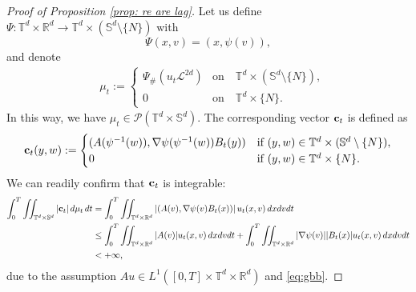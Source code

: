 \documentclass[11pt,reqno,a4paper]{amsart}
\newcommand{\R}{\mathbb{R}}
\theoremstyle{definition}
\theoremstyle{remark}
\numberwithin{equation}{section}
\newcommand{\T} {\mathbb T}
\newcommand{\bfc}{{\bf c}}
\newcommand{\bbS}{\mathbb S}
\newcommand{\calL}{\mathcal L}
\newcommand{\calP}{\mathcal P}
\newcommand{\dx}{\textnormal{d}x}
\newcommand{\dv}{\textnormal{d}v}
\newcommand{\dt}{\textnormal{d}t}
\begin{document}
\begin{proof}[Proof of Proposition \ref{prop: re are lag}]
    Let us define $\Psi:\T^d\times\R^d \to \T^d\times (\bbS^d\setminus\{N\})$ with
\[
\Psi(x,v) = (x,\psi(v)),
\]
    and denote
    \begin{align*}
        &\mu_t := \begin{cases}
        \Psi_{\#}(u_t \calL^{2d}) & \text{on}\quad \T^d\times(\bbS^d \setminus \{N\}),\\
        0 & \text{on}\quad \T^d\times\{N\}.
        \end{cases}
    \end{align*}
    In this way, we have $\mu_t\in \calP(\T^d\times\bbS^d)$. The corresponding vector $\bfc_t$ is defined as
    \begin{align*}
        \bfc_t(y,w) := \begin{cases}
             (A(\psi^{-1}(w)), \nabla \psi(\psi^{-1}(w)) B_t(y))& \text{if }(y,w)\in \T^d\times (\bbS^d\setminus \{N\}),\\
            0 & \text{if }(y,w)\in \T^d\times \{N\}.
        \end{cases}
    \end{align*}
    We can readily confirm that $\bfc_t$ is integrable:
    \begin{align*}
    \int_0^T \iint_{\T^d\times\bbS^d} |\bfc_t| \, \textnormal{d}\mu_t \,\dt &= \int_0^T \iint_{\T^d\times \R^d} \left|(A(v), \nabla \psi(v) B_t(x) ) \right| u_t(x,v)\,\dx\dv\dt  \\
    &\le \int_0^T \iint_{\T^d\times\R^d} |A(v)| u_t(x,v)\,\dx\dv\dt  + \int_0^T \iint_{\T^d\times\R^d} |\nabla \psi(v)| |B_t(x)| u_t(x,v) \,\dx\dv\dt \\
    &< + \infty,   
    \end{align*}
    due to the assumption $Au \in L^1([0,T]\times\T^d\times\R^d)$ and \eqref{eq:gbb}.



\end{proof}
\end{document}
